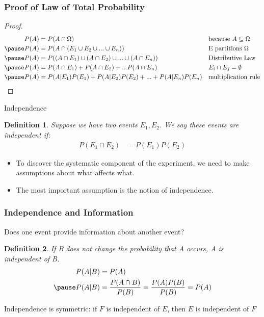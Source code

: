 \documentclass[aspectratio=169, handout]{beamer}
\newtheorem{defn}{Definition}
\numberwithin{equation}{section}
\begin{document}
\begin{frame}
\frametitle{Proof of Law of Total Probability}
\begin{proof} 
\begin{align*}
P(A) &= P(A\cap \Omega) && \text{because }A\subseteq \Omega \\\pause
P(A) &= P(A\cap (E_1\cup E_2 \cup ... \cup E_n))  && \text{E partitions }\Omega \\\pause
P(A) &= P((A\cap E_1)\cup (A\cap E_2) \cup ... \cup(A\cap E_n))  && \text{Distributive Law}\\ \pause
P(A) &=  P(A\cap E_1)+ P(A\cap E_2) + ...P(A\cap E_n)&& E_i\cap E_j=\emptyset\\\pause
P(A) &=  P(A|E_1)P(E_1)+P(A|E_2)P(E_2)+...+P(A|E_n)P(E_n)&&\text{multiplication rule}
\end{align*}

\end{proof}

\end{frame}



\begin{frame}{Independence}

\begin{defn}
Suppose we have two events $E_{1}, E_{2}$.  We say these events are \alert{independent} if:
\begin{align*}
P(E_{1}\cap E_{2}) &= P(E_{1}) P( E_{2})
\end{align*}
\end{defn}
\begin{itemize}
\item To discover the systematic component of the experiment, we need to make assumptions about what affects what.\pause
\item The most important assumption is the notion of independence.
\end{itemize}
\end{frame}



\begin{frame}
\frametitle{Independence and Information} 

Does one event provide \alert{information} about another event? \pause 

\begin{defn} 
If B does not change the probability that A occurs, A is independent of B.
\begin{align*}
P(A|B)&=P(A)\\ \pause
 P(A|B)&=\frac{P(A\cap B)}{P(B)}=\frac{P(A)P(B)}{P(B)}=P(A)
 \end{align*}
\end{defn}
\pause

Independence is symmetric: if $F$ is independent of $E$, then
  $E$ is independent of $F$

\end{frame}
\end{document}
